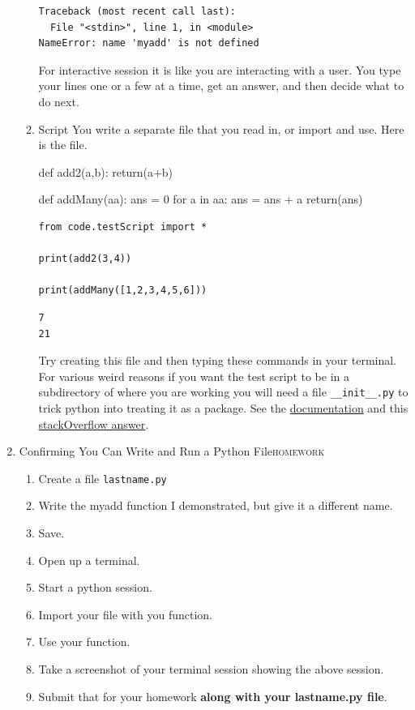 \documentclass{article}
\begin{document}
\begin{enumerate}
\begin{enumerate}
\begin{verbatim}
Traceback (most recent call last):
  File "<stdin>", line 1, in <module>
NameError: name 'myadd' is not defined
\end{verbatim}

For interactive session it is like you are interacting with a user. You type your lines one or a few at a time, get an answer, and then decide what to do next. 
\item Script
\label{sec:org5dd35dc}
You write a separate file that you read in, or import and use. Here is the file.

def add2(a,b):
    return(a+b)

def addMany(aa):
    ans = 0
    for a in aa:
	ans = ans + a
    return(ans)

\begin{verbatim}
from code.testScript import *

print(add2(3,4))

print(addMany([1,2,3,4,5,6]))
\end{verbatim}

\begin{verbatim}
7
21
\end{verbatim}

Try creating this file and then typing these commands in your terminal. For various weird reasons if you want the test script to be in a subdirectory of where you are working you will need a file \texttt{\_\_init\_\_.py} to trick python into treating it as a package. See the \href{https://docs.python.org/3/tutorial/modules.html\#packages}{documentation} and this \href{https://stackoverflow.com/questions/1260792/import-a-file-from-a-subdirectory}{stackOverflow answer}.
\end{enumerate}
\item Confirming You Can Write and Run a Python File\hfill{}\textsc{homework}
\label{sec:orgcd19c89}
\begin{enumerate}
\item Create a file \texttt{lastname.py}
\item Write the myadd function I demonstrated, but give it a different name.
\item Save.
\item Open up a terminal.
\item Start a python session.
\item Import your file with you function.
\item Use your function.
\item Take a screenshot of your terminal session showing the above session.
\item Submit that for your homework \textbf{along with your lastname.py file}.
\end{enumerate}
\end{enumerate}
\end{document}
